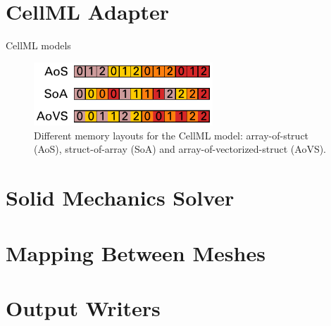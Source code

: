 
\section{CellML Adapter} %

CellML models 

\begin{figure}%
  \centering%
  \includegraphics[width=0.6\textwidth]{images/implementation/memory_layouts.pdf}%
  \caption{Different memory layouts for the CellML model: array-of-struct (AoS), struct-of-array (SoA) and array-of-vectorized-struct (AoVS).}%
  \label{fig:memory_layouts}%
\end{figure}%




\newpage
\section{Solid Mechanics Solver}

\section{Mapping Between Meshes}


\section{Output Writers}  %


